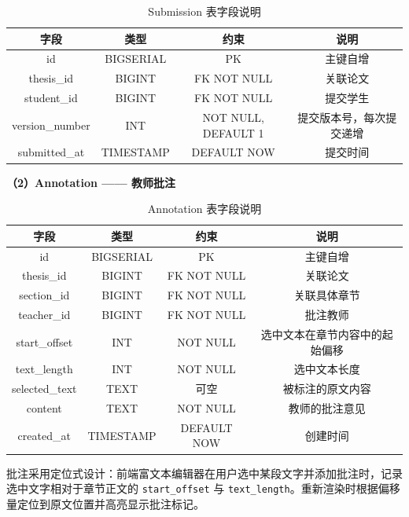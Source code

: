 \documentclass{../../softeng}
\begin{document}
\begin{table}[htbp]
\centering
\caption{Submission 表字段说明}
\label{tab:submission-fields}
\begin{tabular}{|c|c|c|c|}
\hline
\textbf{字段} & \textbf{类型} & \textbf{约束} & \textbf{说明} \\
\hline
id & BIGSERIAL & PK & 主键自增 \\
\hline
thesis\_id & BIGINT & FK NOT NULL & 关联论文 \\
\hline
student\_id & BIGINT & FK NOT NULL & 提交学生 \\
\hline
version\_number & INT & NOT NULL, DEFAULT 1 & 提交版本号，每次提交递增 \\
\hline
submitted\_at & TIMESTAMP & DEFAULT NOW & 提交时间 \\
\hline
\end{tabular}
\end{table}

\textbf{（2）Annotation —— 教师批注}

\begin{table}[htbp]
\centering
\caption{Annotation 表字段说明}
\label{tab:annotation-fields}
\begin{tabular}{|c|c|c|c|}
\hline
\textbf{字段} & \textbf{类型} & \textbf{约束} & \textbf{说明} \\
\hline
id & BIGSERIAL & PK & 主键自增 \\
\hline
thesis\_id & BIGINT & FK NOT NULL & 关联论文 \\
\hline
section\_id & BIGINT & FK NOT NULL & 关联具体章节 \\
\hline
teacher\_id & BIGINT & FK NOT NULL & 批注教师 \\
\hline
start\_offset & INT & NOT NULL & 选中文本在章节内容中的起始偏移 \\
\hline
text\_length & INT & NOT NULL & 选中文本长度 \\
\hline
selected\_text & TEXT & 可空 & 被标注的原文内容 \\
\hline
content & TEXT & NOT NULL & 教师的批注意见 \\
\hline
created\_at & TIMESTAMP & DEFAULT NOW & 创建时间 \\
\hline
\end{tabular}
\end{table}

批注采用定位式设计：前端富文本编辑器在用户选中某段文字并添加批注时，记录选中文字相对于章节正文的 \texttt{start\_offset} 与 \texttt{text\_length}。重新渲染时根据偏移量定位到原文位置并高亮显示批注标记。
\end{document}

